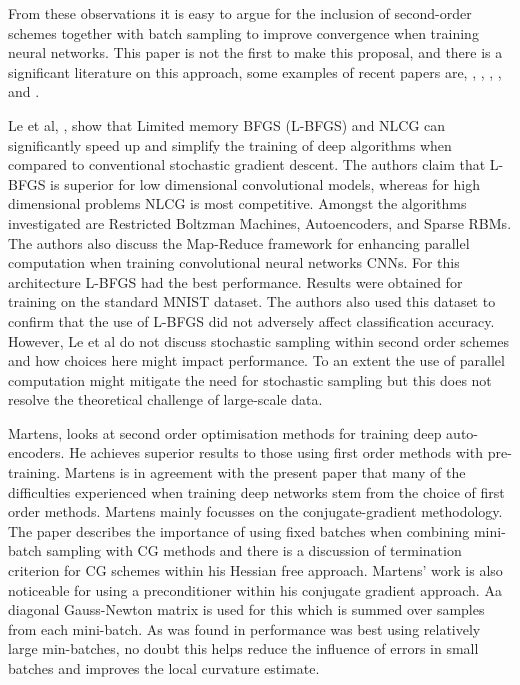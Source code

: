 \documentclass[11pt,twocolumn]{article}
\begin{document}
From these observations it is easy to argue for the inclusion of second-order schemes together with batch sampling to improve convergence when training neural networks. This paper is not the first to make this proposal, and there is a significant literature on this approach, some examples of recent papers are,  \cite{Asi:BetterStoch}, \cite{Le:OptDeep}, \cite{Martens:Deep}, \cite{Xu:2ndNCML}, and  \cite{Zhao:SLBFGS}.

Le et al,  \cite{Le:OptDeep}, show that Limited memory BFGS (L-BFGS) and NLCG can significantly speed up and simplify the training of deep algorithms when compared to conventional stochastic gradient descent. The authors claim that L-BFGS is superior for low dimensional convolutional models, whereas for high dimensional problems NLCG is most competitive. Amongst the algorithms investigated are Restricted Boltzman Machines, Autoencoders, and Sparse RBMs. The authors also discuss the Map-Reduce framework for enhancing parallel computation when training convolutional neural networks CNNs. For this architecture L-BFGS had the best performance. Results were obtained for training on the standard MNIST dataset. The authors also used this dataset to confirm that the use of L-BFGS did not adversely affect classification accuracy. However, Le et al do not discuss stochastic sampling within second order schemes and how choices here might impact performance. To an extent the use of parallel computation might mitigate the need for stochastic sampling but this does not resolve the theoretical challenge of large-scale data.

Martens, \cite{Martens:Deep} looks at second order optimisation methods for training deep auto-encoders. He achieves superior results to those using first order methods with pre-training. Martens is in agreement with the present paper that many of the difficulties experienced when training deep networks stem from the choice of first order methods. Martens mainly focusses on the conjugate-gradient methodology. The paper describes the importance of using fixed batches when combining mini-batch sampling with CG methods and there is a discussion of termination criterion for CG schemes within his Hessian free approach. Martens' work is also noticeable for using a preconditioner within his conjugate gradient approach. Aa diagonal Gauss-Newton matrix is used for this which is summed over samples from each mini-batch. As was found in  \cite{Le:OptDeep} performance was best using relatively large min-batches, no doubt this helps reduce the influence of errors in small batches and improves the local curvature estimate.
\end{document}
